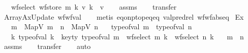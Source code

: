 \begin{isabellebody}
\ \ \ {\isachardoublequoteopen}wf{\isacharunderscore}{\kern0pt}select\ {\isacharparenleft}{\kern0pt}wf{\isacharunderscore}{\kern0pt}store\ m\ k\ v{\isacharparenright}{\kern0pt}\ k\ {\isacharequal}{\kern0pt}\ v{\isachardoublequoteclose}\isanewline
%
\isadelimproof
\ \ %
\endisadelimproof
%
\isatagproof
{}\isamarkupfalse%
\ assms\isanewline
\ \ \isamarkupfalse%
\ transfer\isanewline
\ \ \isamarkupfalse%
\ ArrayAxUpdate\ wf{\isacharunderscore}{\kern0pt}wf{\isacharunderscore}{\kern0pt}val\isanewline
\ \ \isamarkupfalse%
\ {\isacharparenleft}{\kern0pt}metis\ eq{\isacharunderscore}{\kern0pt}onp{\isacharunderscore}{\kern0pt}top{\isacharunderscore}{\kern0pt}eq{\isacharunderscore}{\kern0pt}eq\ val{\isachardot}{\kern0pt}pred{\isacharunderscore}{\kern0pt}rel\ wf{\isacharunderscore}{\kern0pt}wf{\isachardot}{\kern0pt}abs{\isacharunderscore}{\kern0pt}eq{\isacharparenright}{\kern0pt}%
\endisatagproof
{\isafoldproof}%
%
\isadelimproof
\isanewline
%
\endisadelimproof
\isanewline
{}\isamarkupfalse%
\ Ex{\isacharcolon}{\kern0pt}\isanewline
\ \ \ {\isachardoublequoteopen}m\ {\isacharequal}{\kern0pt}\ MapV\ m{\isacharprime}{\kern0pt}\ {\isasymand}\ n\ {\isacharequal}{\kern0pt}\ MapV\ n{\isacharprime}{\kern0pt}{\isachardoublequoteclose}\isanewline
\ \ \ {\isachardoublequoteopen}type{\isacharunderscore}{\kern0pt}of{\isacharunderscore}{\kern0pt}val\ m\ {\isacharequal}{\kern0pt}\ type{\isacharunderscore}{\kern0pt}of{\isacharunderscore}{\kern0pt}val\ n{\isachardoublequoteclose}\isanewline
\ \ \ {\isachardoublequoteopen}{\isasymforall}k{\isachardot}{\kern0pt}\ type{\isacharunderscore}{\kern0pt}of{\isacharunderscore}{\kern0pt}val\ k\ {\isacharequal}{\kern0pt}\ key{\isacharunderscore}{\kern0pt}ty\ {\isacharparenleft}{\kern0pt}type{\isacharunderscore}{\kern0pt}of{\isacharunderscore}{\kern0pt}val\ m{\isacharparenright}{\kern0pt}\ {\isasymlongrightarrow}\ wf{\isacharunderscore}{\kern0pt}select\ m\ k\ {\isacharequal}{\kern0pt}\ wf{\isacharunderscore}{\kern0pt}select\ n\ k{\isachardoublequoteclose}\isanewline
\ \ \ {\isachardoublequoteopen}m\ {\isacharequal}{\kern0pt}\ n{\isachardoublequoteclose}\isanewline
%
\isadelimproof
\ \ %
\endisadelimproof
%
\isatagproof
{}\isamarkupfalse%
\ assms\isanewline
\ \ \isamarkupfalse%
\ transfer\isanewline
\ \ \isamarkupfalse%
\ auto{\isacharbrackleft}{\kern0pt}{}{\isacharbrackright}{\kern0pt}\isanewline

\end{isabellebody}
